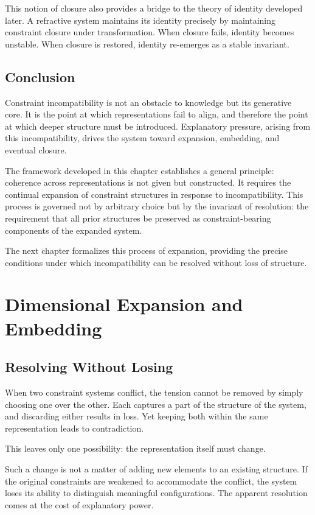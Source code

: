 \documentclass[11pt,openany]{book}
\begin{document}
This notion of closure also provides a bridge to the theory
of identity developed later. A refractive system maintains
its identity precisely by maintaining constraint closure
under transformation. When closure fails, identity becomes
unstable. When closure is restored, identity re-emerges as
a stable invariant.

\section{Conclusion}
\label{sec:conclusion-incompatibility}

Constraint incompatibility is not an obstacle to knowledge
but its generative core. It is the point at which
representations fail to align, and therefore the point at
which deeper structure must be introduced. Explanatory
pressure, arising from this incompatibility, drives the
system toward expansion, embedding, and eventual closure.

The framework developed in this chapter establishes a
general principle: coherence across representations is not
given but constructed. It requires the continual expansion
of constraint structures in response to incompatibility.
This process is governed not by arbitrary choice but by the
invariant of resolution: the requirement that all prior
structures be preserved as constraint-bearing components of
the expanded system.

The next chapter formalizes this process of expansion,
providing the precise conditions under which incompatibility
can be resolved without loss of structure.

\chapter{Dimensional Expansion and Embedding}
\label{ch:expansion}

\section*{ Resolving Without Losing}

When two constraint systems conflict, the tension cannot be removed by simply choosing one over the other. Each captures a part of the structure of the system, and discarding either results in loss. Yet keeping both within the same representation leads to contradiction.

This leaves only one possibility: the representation itself must change.

Such a change is not a matter of adding new elements to an existing structure. If the original constraints are weakened to accommodate the conflict, the system loses its ability to distinguish meaningful configurations. The apparent resolution comes at the cost of explanatory power.
\end{document}
